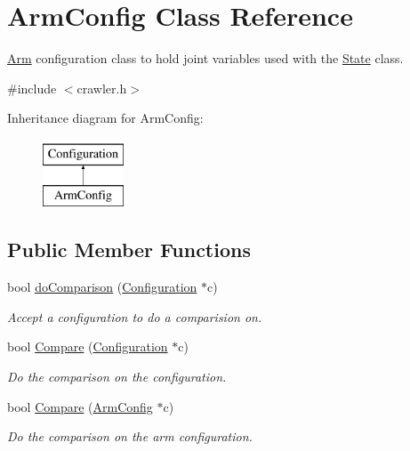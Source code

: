 \hypertarget{classArmConfig}{\section{Arm\-Config Class Reference}
\label{classArmConfig}
}


\hyperlink{classArm}{Arm} configuration class to hold joint variables used with the \hyperlink{classState}{State} class.  




{\ttfamily \#include $<$crawler.\-h$>$}

Inheritance diagram for Arm\-Config\-:\begin{figure}[H]
\begin{center}
\leavevmode
\includegraphics[height=2.000000cm]{classArmConfig}
\end{center}
\end{figure}
\subsection*{Public Member Functions}
\begin{DoxyCompactItemize}
\item 
bool \hyperlink{classArmConfig_a9c88c588472e0c18024d4a6c30f1f531}{do\-Comparison} (\hyperlink{classConfiguration}{Configuration} $\ast$c)
\begin{DoxyCompactList}\small\item\em Accept a configuration to do a comparision on. \end{DoxyCompactList}\item 
bool \hyperlink{classArmConfig_af97e33e4a0b4faaf611737e375e15e23}{Compare} (\hyperlink{classConfiguration}{Configuration} $\ast$c)
\begin{DoxyCompactList}\small\item\em Do the comparison on the configuration. \end{DoxyCompactList}\item 
bool \hyperlink{classArmConfig_a91931a29109e8b018d1c600c462fb95f}{Compare} (\hyperlink{classArmConfig}{Arm\-Config} $\ast$c)
\begin{DoxyCompactList}\small\item\em Do the comparison on the arm configuration. \end{DoxyCompactList}\end{DoxyCompactItemize}
